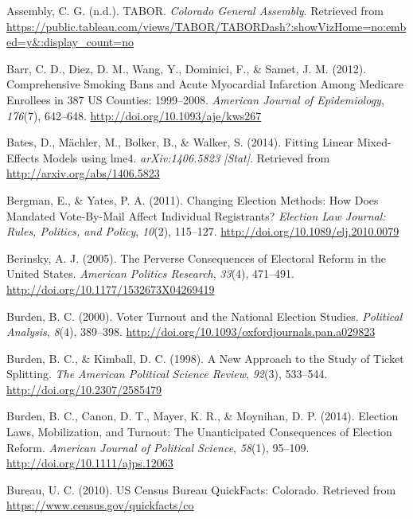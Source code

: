 \documentclass[12pt,twoside]{reedthesis}
\begin{document}
  \hypertarget{ref-colorado_general_assembly_tabor_nodate}{}
  Assembly, C. G. (n.d.). TABOR. \emph{Colorado General Assembly}.
  Retrieved from
  \url{https://public.tableau.com/views/TABOR/TABORDash?:showVizHome=no:embed=y\&:display_count=no}
  
  \hypertarget{ref-barr_comprehensive_2012}{}
  Barr, C. D., Diez, D. M., Wang, Y., Dominici, F., \& Samet, J. M.
  (2012). Comprehensive Smoking Bans and Acute Myocardial Infarction Among
  Medicare Enrollees in 387 US Counties: 1999--2008. \emph{American
  Journal of Epidemiology}, \emph{176}(7), 642--648.
  \url{http://doi.org/10.1093/aje/kws267}
  
  \hypertarget{ref-bates_fitting_2014}{}
  Bates, D., Mächler, M., Bolker, B., \& Walker, S. (2014). Fitting Linear
  Mixed-Effects Models using lme4. \emph{arXiv:1406.5823 {[}Stat{]}}.
  Retrieved from \url{http://arxiv.org/abs/1406.5823}
  
  \hypertarget{ref-bergman_changing_2011}{}
  Bergman, E., \& Yates, P. A. (2011). Changing Election Methods: How Does
  Mandated Vote-By-Mail Affect Individual Registrants? \emph{Election Law
  Journal: Rules, Politics, and Policy}, \emph{10}(2), 115--127.
  \url{http://doi.org/10.1089/elj.2010.0079}
  
  \hypertarget{ref-berinsky_perverse_2005}{}
  Berinsky, A. J. (2005). The Perverse Consequences of Electoral Reform in
  the United States. \emph{American Politics Research}, \emph{33}(4),
  471--491. \url{http://doi.org/10.1177/1532673X04269419}
  
  \hypertarget{ref-burden_voter_2000}{}
  Burden, B. C. (2000). Voter Turnout and the National Election Studies.
  \emph{Political Analysis}, \emph{8}(4), 389--398.
  \url{http://doi.org/10.1093/oxfordjournals.pan.a029823}
  
  \hypertarget{ref-burden_new_1998}{}
  Burden, B. C., \& Kimball, D. C. (1998). A New Approach to the Study of
  Ticket Splitting. \emph{The American Political Science Review},
  \emph{92}(3), 533--544. \url{http://doi.org/10.2307/2585479}
  
  \hypertarget{ref-burden_election_2014}{}
  Burden, B. C., Canon, D. T., Mayer, K. R., \& Moynihan, D. P. (2014).
  Election Laws, Mobilization, and Turnout: The Unanticipated Consequences
  of Election Reform. \emph{American Journal of Political Science},
  \emph{58}(1), 95--109. \url{http://doi.org/10.1111/ajps.12063}
  
  \hypertarget{ref-us_census_bureau_us_2010}{}
  Bureau, U. C. (2010). US Census Bureau QuickFacts: Colorado. Retrieved
  from \url{https://www.census.gov/quickfacts/co}
  
\end{document}
